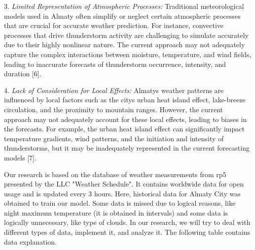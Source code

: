 \begin{multicols}{2}
3. \emph{Limited Representation of Atmospheric Processes:} Traditional
meteorological models used in Almaty often simplify or neglect certain
atmospheric processes that are crucial for accurate weather
prediction. For instance, convective processes that drive thunderstorm
activity are challenging to simulate accurately due to their highly
nonlinear nature. The current approach may not adequately capture the
complex interactions between moisture, temperature, and wind fields,
leading to inaccurate forecasts of thunderstorm occurrence, intensity,
and duration {[}6{]}.

4. \emph{Lack of Consideration for Local Effects:}
Almaty\textquotesingle s weather patterns are influenced by local
factors such as the city\textquotesingle s urban heat island effect,
lake-breeze circulation, and the proximity to mountain ranges.
However, the current approach may not adequately account for these
local effects, leading to biases in the forecasts. For example, the
urban heat island effect can significantly impact temperature
gradients, wind patterns, and the initiation and intensity of
thunderstorms, but it may be inadequately represented in the current
forecasting models {[}7{]}.

Our research is based on the database of weather measurements from rp5
presented by the LLC "Weather Schedule". It contains worldwide data for
open usage and is updated every 3 hours. Here, historical data for
Almaty City was obtained to train our model. Some data is missed due to
logical reasons, like night maximum temperature (it is obtained in
intervals) and some data is logically unnecessary, like type of clouds.
In our research, we will try to deal with different types of data,
implement it, and analyze it. The following table contains data
explanation.
\end{multicols}

